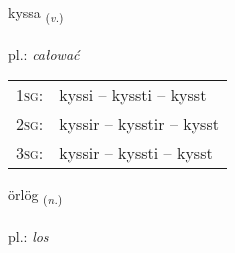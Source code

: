 \documentclass[frontgrid, backgrid]{flacards}\usepackage[]{graphicx}\usepackage[]{xcolor}
\begin{document}
\renewcommand{\flhead}{\vskip5pt \fboxsep=0pt {\small\bfseries\footnotesize Sagnorð | czasownik}}
\renewcommand{\fcfoot}{\vskip5pt \fboxsep=0pt \hspace{2pt}{\small\bfseries\footnotesize 3K}}

\renewcommand{\blhead}{\vskip5pt {\small\bfseries\footnotesize Sagnorð | czasownik }}
\renewcommand{\bcfoot}{\vskip5pt \hspace{2pt}{\small\bfseries\footnotesize 3K}}


{kyssa \small{\textsubscript{(\textit{v.})}} \\[1ex] %
\textphonetic{[cʰɪsa]} \\
pl.: \emph{całować} \\  [2ex]
\renewcommand*{\arraystretch}{0.8}
\begin{tabular}{p{1cm}l}
\textsc{1sg}: & kyssi -- kyssti -- kysst \\ 
\textsc{2sg}: & kyssir -- kysstir -- kysst \\ 
\textsc{3sg}: & kyssir -- kyssti -- kysst \\ 
\end{tabular}
}

\renewcommand{\flhead}{\vskip5pt \fboxsep=0pt {\small\bfseries\footnotesize Nafnorð | rzeczownik}}
\renewcommand{\fcfoot}{\vskip5pt \fboxsep=0pt \hspace{2pt}{\small\bfseries\footnotesize 3K}}

\renewcommand{\blhead}{\vskip5pt {\small\bfseries\footnotesize Nafnorð | rzeczownik }}
\renewcommand{\bcfoot}{\vskip5pt \hspace{2pt}{\small\bfseries\footnotesize 3K}}


{örlög \small{\textsubscript{(\textit{n.})}} \\[1ex] %
\textphonetic{[œrlœɣ]} \\
pl.: \emph{los} \\  [2ex]
\renewcommand*{\arraystretch}{0.8}
}
\end{document}
